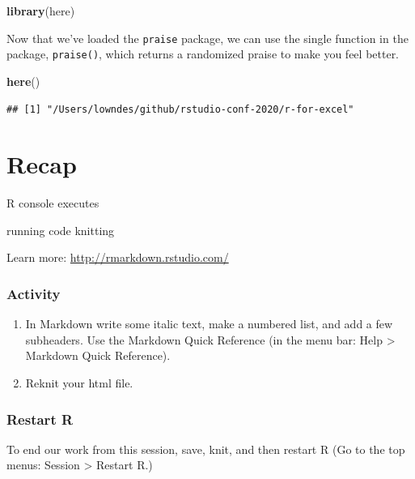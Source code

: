 \documentclass[]{book}
\newenvironment{Shaded}{\begin{snugshade}}{\end{snugshade}}
\newcommand{\KeywordTok}[1]{\textcolor[rgb]{0.13,0.29,0.53}{\textbf{#1}}}
\newcommand{\NormalTok}[1]{#1}
\providecommand{\tightlist}{%
  \setlength{\itemsep}{0pt}\setlength{\parskip}{0pt}}
\begin{document}
\begin{Shaded}
\begin{Highlighting}[]
\KeywordTok{library}\NormalTok{(here)}
\end{Highlighting}
\end{Shaded}

Now that we've loaded the \texttt{praise} package, we can use the single function in the package, \texttt{praise()}, which returns a randomized praise to make you feel better.

\begin{Shaded}
\begin{Highlighting}[]
\KeywordTok{here}\NormalTok{()}
\end{Highlighting}
\end{Shaded}

\begin{verbatim}
## [1] "/Users/lowndes/github/rstudio-conf-2020/r-for-excel"
\end{verbatim}

\hypertarget{recap}{%
\section{Recap}\label{recap}}

R console executes

running code
knitting

Learn more: \url{http://rmarkdown.rstudio.com/}

\hypertarget{activity}{%
\subsubsection{Activity}\label{activity}}

\begin{enumerate}
\def\labelenumi{\arabic{enumi}.}
\tightlist
\item
  In Markdown write some italic text, make a numbered list, and add a few subheaders.
  Use the Markdown Quick Reference (in the menu bar: Help \textgreater{} Markdown Quick Reference).
\item
  Reknit your html file.
\end{enumerate}

\hypertarget{restart-r}{%
\subsubsection{Restart R}\label{restart-r}}

To end our work from this session, save, knit, and then restart R (Go to the top menus: Session \textgreater{} Restart R.)
\end{document}
